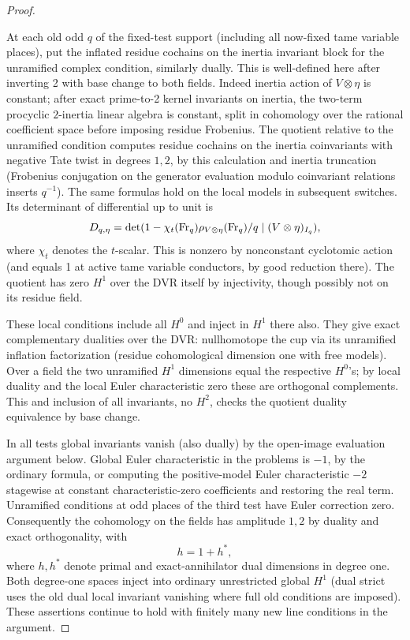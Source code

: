 \begin{proof}
\begin{itemize}
At each old odd \(q\) of the fixed-test support (including all now-fixed tame variable places), put the inflated residue cochains on the inertia invariant block for the unramified complex condition, similarly dually. This is well-defined here after inverting 2 with base change to both fields. Indeed inertia action of \(V\otimes\eta\) is constant; after exact prime-to-2 kernel invariants on inertia, the two-term procyclic \(2\)-inertia linear algebra is constant, split in cohomology over the rational coefficient space before imposing residue Frobenius. The quotient relative to the unramified condition computes residue cochains on the inertia coinvariants with negative Tate twist in degrees \(1,2\), by this calculation and inertia truncation (Frobenius conjugation on the generator evaluation modulo coinvariant relations inserts \(q^{-1}\)). The same formulas hold on the local models in subsequent switches. Its determinant of differential up to unit is
\[
 D_{q,\eta}=\det(1-\chi_t({\rm Fr}_q)\rho_{V\otimes\eta}({\rm Fr}_q)/q
                                 \mid (V\otimes\eta)_{I_q}),
\]
where \(\chi_t\) denotes the \(t\)-scalar. This is nonzero by nonconstant cyclotomic action (and equals 1 at active tame variable conductors, by good reduction there). The quotient has zero \(H^1\) over the DVR itself by injectivity, though possibly not on its residue field. 

These local conditions include all \(H^0\) and inject in \(H^1\) there also. They give exact complementary dualities over the DVR: nullhomotope the cup via its unramified inflation factorization (residue cohomological dimension one with free models). Over a field the two unramified \(H^1\) dimensions equal the respective \(H^0\)'s; by local duality and the local Euler characteristic zero these are orthogonal complements. This and inclusion of all invariants, no \(H^2\), checks the quotient duality equivalence by base change.
\end{itemize}

In all tests global invariants vanish (also dually) by the open-image evaluation argument below. Global Euler characteristic in the problems is \(-1\), by the ordinary formula, or computing the positive-model Euler characteristic \(-2\) stagewise at constant characteristic-zero coefficients and restoring the real term. Unramified conditions at odd places of the third test have Euler correction zero. Consequently the cohomology on the fields has amplitude \(1,2\) by duality and exact orthogonality, with
\[
                         h=1+h^*,
\]
where \(h,h^*\) denote primal and exact-annihilator dual dimensions in degree one. Both degree-one spaces inject into ordinary unrestricted global \(H^1\) (dual strict uses the old dual local invariant vanishing where full old conditions are imposed). These assertions continue to hold with finitely many new line conditions in the argument.


\end{proof}
